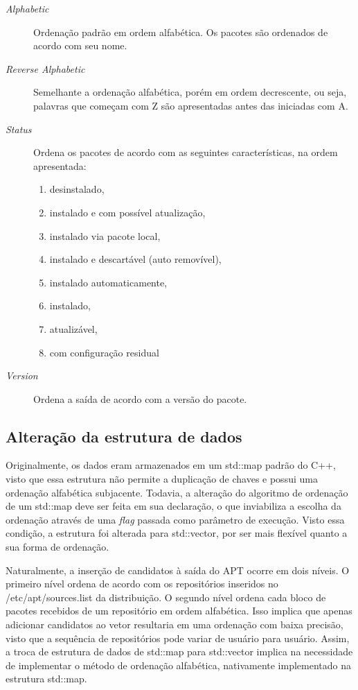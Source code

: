 \begin{description}
	\item [\textit{Alphabetic}] Ordenação padrão em ordem alfabética. Os pacotes são ordenados de acordo com seu nome.
	\item [\textit{Reverse Alphabetic}] Semelhante a ordenação alfabética, porém em ordem decrescente, ou seja, palavras que começam com {\code Z} são apresentadas antes das iniciadas com {\code A}.
	\item [\textit{Status}] Ordena os pacotes de acordo com as seguintes características, na ordem apresentada:
	\begin{enumerate}
		\item desinstalado,
		\item instalado e com possível atualização,
		\item instalado via pacote local,
		\item instalado e descartável (auto removível),
		\item instalado automaticamente,
		\item instalado,
		\item atualizável,
		\item com configuração residual
	\end{enumerate}
	\item [\textit{Version}] Ordena a saída de acordo com a versão do pacote.
\end{description}

\subsection*{Alteração da estrutura de dados} %
\label{sub:altera_o_da_estrutuda_de_dados}

Originalmente, os dados eram armazenados em um {\code std::map} padrão do {\code C++}, visto que essa estrutura não permite a duplicação de chaves e possui uma ordenação alfabética subjacente. Todavia, a alteração do algoritmo de ordenação de um {\code std::map} deve ser feita em sua declaração, o que inviabiliza a escolha da ordenação através de uma \textit{flag} passada como parâmetro de execução. Visto essa condição, a estrutura foi alterada para {\code std::vector}, por ser mais flexível quanto a sua forma de ordenação.

Naturalmente, a inserção de candidatos à saída do {\code APT} ocorre  em dois níveis. O primeiro nível ordena de acordo com os repositórios inseridos no {\code /etc/apt/sources.list} da distribuição. O segundo nível ordena cada bloco de pacotes recebidos de um repositório em ordem alfabética. Isso implica que apenas adicionar candidatos ao vetor resultaria em uma ordenação com baixa precisão, visto que a sequência de repositórios pode variar de usuário para usuário. Assim, a  troca de estrutura de dados de {\code std::map} para {\code std::vector} implica na necessidade de implementar o método de ordenação alfabética, nativamente implementado na estrutura {\code std::map}.


